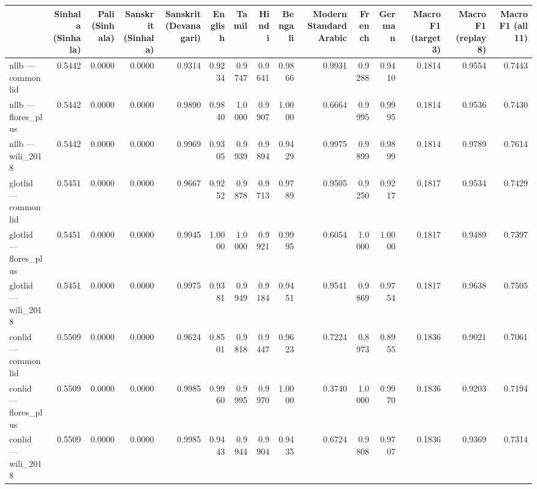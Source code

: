 \begin{tabular}{lrrrrrrrrrrrrrr}
\toprule
 & Sinhala (Sinhala) & Pali (Sinhala) & Sanskrit (Sinhala) & Sanskrit (Devanagari) & English & Tamil & Hindi & Bengali & Modern Standard Arabic & French & German & Macro F1 (target 3) & Macro F1 (replay 8) & Macro F1 (all 11) \\
\midrule
nllb — commonlid & 0.5442 & 0.0000 & 0.0000 & 0.9314 & 0.9234 & 0.9747 & 0.9641 & 0.9866 & 0.9931 & 0.9288 & 0.9410 & 0.1814 & 0.9554 & 0.7443 \\
nllb — flores\_plus & 0.5442 & 0.0000 & 0.0000 & 0.9890 & 0.9840 & 1.0000 & 0.9907 & 1.0000 & 0.6664 & 0.9995 & 0.9995 & 0.1814 & 0.9536 & 0.7430 \\
nllb — wili\_2018 & 0.5442 & 0.0000 & 0.0000 & 0.9969 & 0.9305 & 0.9939 & 0.9894 & 0.9429 & 0.9975 & 0.9899 & 0.9899 & 0.1814 & 0.9789 & 0.7614 \\
glotlid — commonlid & 0.5451 & 0.0000 & 0.0000 & 0.9667 & 0.9252 & 0.9878 & 0.9713 & 0.9789 & 0.9505 & 0.9250 & 0.9217 & 0.1817 & 0.9534 & 0.7429 \\
glotlid — flores\_plus & 0.5451 & 0.0000 & 0.0000 & 0.9945 & 1.0000 & 1.0000 & 0.9921 & 0.9995 & 0.6054 & 1.0000 & 1.0000 & 0.1817 & 0.9489 & 0.7397 \\
glotlid — wili\_2018 & 0.5451 & 0.0000 & 0.0000 & 0.9975 & 0.9381 & 0.9949 & 0.9184 & 0.9451 & 0.9541 & 0.9869 & 0.9754 & 0.1817 & 0.9638 & 0.7505 \\
conlid — commonlid & 0.5509 & 0.0000 & 0.0000 & 0.9624 & 0.8501 & 0.9818 & 0.9447 & 0.9623 & 0.7224 & 0.8973 & 0.8955 & 0.1836 & 0.9021 & 0.7061 \\
conlid — flores\_plus & 0.5509 & 0.0000 & 0.0000 & 0.9985 & 0.9960 & 0.9995 & 0.9970 & 1.0000 & 0.3740 & 1.0000 & 0.9970 & 0.1836 & 0.9203 & 0.7194 \\
conlid — wili\_2018 & 0.5509 & 0.0000 & 0.0000 & 0.9985 & 0.9443 & 0.9944 & 0.9904 & 0.9435 & 0.6724 & 0.9808 & 0.9707 & 0.1836 & 0.9369 & 0.7314 \\
\bottomrule
\end{tabular}
